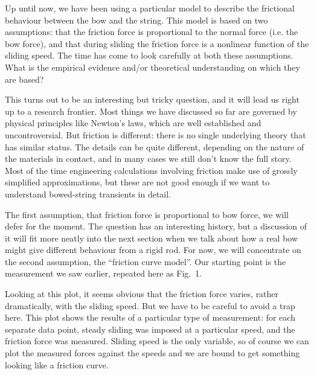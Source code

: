 

  Up until now, we have been using a particular model to describe the 
  frictional behaviour between the bow and the string. This model is based on 
  two assumptions: that the friction force is proportional to the normal force 
  (i.e. the bow force), and that during sliding the friction force is a 
  nonlinear function of the sliding speed. The time has come to look carefully 
  at both these assumptions. What is the empirical evidence and/or theoretical 
  understanding on which they are based? 

  This turns out to be an interesting but tricky question, and it will lead us 
  right up to a research frontier. Most things we have discussed so far are 
  governed by physical principles like Newton’s laws, which are well 
  established and uncontroversial. But friction is different: there is no 
  single underlying theory that has similar status. The details can be quite 
  different, depending on the nature of the materials in contact, and in many 
  cases we still don’t know the full story. Most of the time engineering 
  calculations involving friction make use of grossly simplified 
  approximations, but these are not good enough if we want to understand 
  bowed-string transients in detail. 

  The first assumption, that friction force is proportional to bow force, we 
  will defer for the moment. The question has an interesting history, but a 
  discussion of it will fit more neatly into the next section when we talk 
  about how a real bow might give different behaviour from a rigid rod. For 
  now, we will concentrate on the second assumption, the “friction curve 
  model”. Our starting point is the measurement we saw earlier, repeated here 
  as Fig.\ 1. 


  Looking at this plot, it seems obvious that the friction force varies, rather 
  dramatically, with the sliding speed. But we have to be careful to avoid a 
  trap here. This plot shows the results of a particular type of measurement: 
  for each separate data point, steady sliding was imposed at a particular 
  speed, and the friction force was measured. Sliding speed is the only 
  variable, so of course we can plot the measured forces against the speeds and 
  we are bound to get something looking like a friction curve. 

